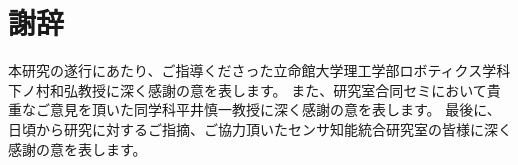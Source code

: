 \section*{謝辞}

本研究の遂行にあたり、ご指導くださった立命館大学理工学部ロボティクス学科 下ノ村和弘教授に深く感謝の意を表します。
また、研究室合同セミにおいて貴重なご意見を頂いた同学科平井慎一教授に深く感謝の意を表します。
最後に、日頃から研究に対するご指摘、ご協力頂いたセンサ知能統合研究室の皆様に深く感謝の意を表します。
